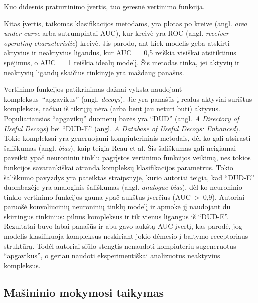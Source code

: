 Kuo didesnis praturtinimo įvertis, tuo geresnė vertinimo funkcija. 

Kitas įvertis, taikomas klasifikacijos metodams, yra plotas po kreive (angl. \textit{area under curve} arba sutrumpintai AUC), kur kreivė yra ROC (angl. \textit{receiver operating characteristic}) kreivė. Jis parodo, ant kiek modelis geba atskirti aktyvius ir neaktyvius ligandus, kur AUC~=~0,5 reiškia visiškai atsitiktinus spėjimus, o AUC~=~1 reiškia idealų modelį. Šis metodas tinka, jei aktyvių ir neaktyvių ligandų skaičius rinkinyje yra maždaug panašus.\cite{huang_scoring_2010}

Vertinimo funkcijos patikrinimas dažnai vyksta naudojant kompleksus--\enquote{apgavikus} (angl. \textit{decoys}). Jie yra panašūs į realus aktyviai surištus kompleksus, tačiau iš tikrųjų nėra (arba bent jau neturi būti) aktyvūs. Populiariausios \enquote{apgavikų} duomenų bazės yra \enquote{DUD} (angl. \textit{A Directory of Useful Decoys}) bei \enquote{DUD-E} (angl. \textit{A Database of Useful Decoys: Enhanced}).\cite{berry_practical_2015} Tokie kompleksai yra generuojami kompiuteriniais metodais, dėl ko gali atsirasti šališkumas (angl. \textit{bias}), kaip teigia Reau et al.\cite{reau_decoys_2018} Šis šališkumas gali neigiamai paveikti ypač neuroniniu tinklu pagrįstos vertinimo funkcijos veikimą, nes tokios funkcijos savarankiškai atranda kompleksų klasifikacijos parametrus. Tokio šališkumo pavyzdys yra pateiktas straipsnyje\cite{chen_hidden_2019}, kurio autoriai teigia, kad \enquote{DUD-E} duombazėje yra analoginis šališkumas (angl. \textit{analogue bias}), dėl ko neuroninio tinklo vertinimo funkcijos gauna ypač aukštus įverčius (AUC~>~0,9). Autoriai paruošė konvoliucinių neuroninių tinklų modelį ir apmokė jį naudojant du skirtingus rinkinius: pilnus kompleksus ir tik vienus ligangus iš \enquote{DUD-E}. Rezultatai buvo labai panašūs ir abu gavo aukštą AUC įvertį, kas parodė, jog modelis klasifikuoja kompleksus neskiriant jokio dėmesio į baltymo receptoriaus struktūrą. Todėl autoriai siūlo stengtis nenaudoti kompiuteriu sugeneruotus \enquote{apgavikus}, o geriau naudoti eksperimentiškai analizuotus neaktyvius kompleksus. 

\subsection{Mašininio mokymosi taikymas}

